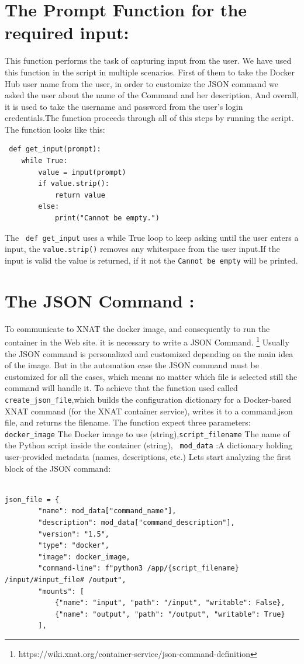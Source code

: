 \section{The Prompt Function for the required input:}

 This function performs the task of capturing input from the user.
 We have used this function in the script in multiple scenarios. First of them to take the Docker Hub user name from the user, in order to customize the JSON command we asked the user about the name of the Command and her description, And overall, it is used to take the username and password from the user's login credentials.The function proceeds through all of this steps by running the script.
 The function looks like this:
 
 \begin{lstlisting}
 def get_input(prompt):
    while True:
        value = input(prompt)
        if value.strip():
            return value
        else:
            print("Cannot be empty.")

\end{lstlisting}
The \texttt{ def get\_input} uses a while True loop to keep asking until the user enters a input, the \texttt{value.strip()} removes any whitespace from the user input.If the input is valid the value is returned, if it not the \texttt{Cannot be empty} will be printed.


\section{The JSON Command :}

To communicate to XNAT the docker image, and consequently to run the container in the Web site. it is necessary to write a JSON Command. 
\footnote{https://wiki.xnat.org/container-service/json-command-definition}
Usually the JSON command is personalized and customized depending on the main idea of the image. But in the automation case the JSON command must be customized for all the cases, which means no matter which file is  selected still the command will handle it.
To achieve that the function used called \texttt{create\_json\_file},which builds the configuration dictionary for a Docker-based XNAT command (for the XNAT container service), writes it to a command.json file, and returns the filename.
The function expect three parameters:
\texttt{docker\_image} The Docker image to use (string),\texttt{script\_filename} The name of the Python script inside the container (string), \texttt{ mod\_data} :A dictionary holding user-provided metadata (names, descriptions, etc.)
Lets start analyzing the first block of the JSON command:
\begin{lstlisting}

json_file = {
        "name": mod_data["command_name"],
        "description": mod_data["command_description"],
        "version": "1.5",
        "type": "docker",
        "image": docker_image,
        "command-line": f"python3 /app/{script_filename} /input/#input_file# /output",
        "mounts": [
            {"name": "input", "path": "/input", "writable": False},
            {"name": "output", "path": "/output", "writable": True}
        ],
\end{lstlisting}


